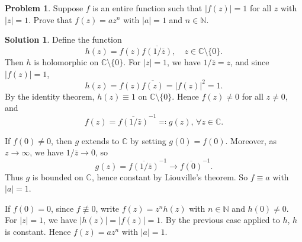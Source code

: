 \documentclass{article}
\theoremstyle{definition}
\newtheorem{problem}{Problem}
\newtheorem{solution}{Solution}
\newcommand{\N}{\mathbb{N}}
\newcommand{\C}{\mathbb{C}}
\begin{document}
\begin{problem}
    Suppose $f$ is an entire function such that $|f(z)|=1$ for all $z$ with $|z|=1$. Prove that $f(z)=az^n$ with $|a|=1$ and $n\in \N$.
\end{problem}
\begin{solution}
    Define the function 
    \[
    h(z)=f(z)\overline{f(1/\bar{z})}, \quad z\in \mathbb C\setminus\{0\}.
    \]
    Then \(h\) is holomorphic on \(\mathbb C\setminus\{0\}\). For \(|z|=1\), we have \(1/\bar{z}=z\), and since \(|f(z)|=1\),
    \[
    h(z)=f(z)\overline{f(z)}=|f(z)|^2=1.
    \]
    By the identity theorem, \(h(z)\equiv 1\) on \(\mathbb C\setminus\{0\}\). Hence \(f(z)\neq 0\) for all \(z\neq 0\), and 
    \[
    f(z)=\overline{f(1/\bar{z})}^{-1}\eqqcolon g(z),\,\forall z\in \C.
    \]

    If \(f(0)\neq 0\), then \(g\) extends to \(\C\) by setting \(g(0)=f(0)\). Moreover, as \(z\to\infty\), we have \(1/\bar{z}\to 0\), so 
    \[
    g(z)=\overline{f(1/\bar{z})}^{-1}\to \overline{f(0)}^{-1}.
    \]
    Thus \(g\) is bounded on \(\mathbb C\), hence constant by Liouville's theorem. So \(f\equiv a\) with \(|a|=1\).

    If \(f(0)=0\), since \(f\not\equiv 0\), write \(f(z)=z^n h(z)\) with \(n\in\mathbb N\) and \(h(0)\neq 0\). For \(|z|=1\), we have \(|h(z)|=|f(z)|=1\). By the previous case applied to \(h\), \(h\) is constant. Hence \(f(z)=a z^n\) with \(|a|=1\). \qedsymbol
\end{solution}
\end{document}
